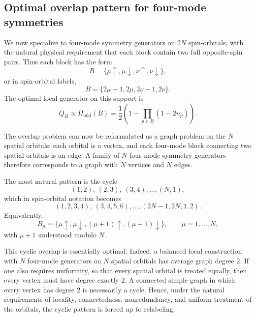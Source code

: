 \documentclass[11pt]{article}
\newcommand{\odd}{\mathrm{odd}}
\theoremstyle{definition}
\theoremstyle{remark}
\begin{document}
\subsection{Optimal overlap pattern for four-mode symmetries}
We now specialize to four-mode symmetry generators on $2N$ spin-orbitals, with the natural physical requirement that each block contain two full opposite-spin pairs. Thus each block has the form
\begin{equation}
  B=\{\mu\uparrow,\mu\downarrow,\nu\uparrow,\nu\downarrow\},
\end{equation}
or in spin-orbital labels,
\begin{equation}
  B=\{2\mu-1,2\mu,2\nu-1,2\nu\}.
\end{equation}
The optimal local generator on this support is
\begin{equation}
  Q_B \propto \Pi_{\odd}(B)=\frac12\left(1-\prod_{p\in B}(1-2n_p)\right).
\end{equation}

The overlap problem can now be reformulated as a graph problem on the $N$ spatial orbitals: each orbital is a vertex, and each four-mode block connecting two spatial orbitals is an edge. A family of $N$ four-mode symmetry generators therefore corresponds to a graph with $N$ vertices and $N$ edges.

The most natural pattern is the cycle
\begin{equation}
  (1,2),\ (2,3),\ (3,4),\dots,(N,1),
\end{equation}
which in spin-orbital notation becomes
\begin{equation}
  (1,2,3,4),\ (3,4,5,6),\dots,(2N-1,2N,1,2).
\end{equation}
Equivalently,
\begin{equation}
  B_\mu=
  \{\mu\uparrow,\mu\downarrow,(\mu+1)\uparrow,(\mu+1)\downarrow\},
  \qquad \mu=1,\dots,N,
\end{equation}
with $\mu+1$ understood modulo $N$.

This cyclic overlap is essentially optimal. Indeed, a balanced local construction with $N$ four-mode generators on $N$ spatial orbitals has average graph degree $2$. If one also requires uniformity, so that every spatial orbital is treated equally, then every vertex must have degree exactly $2$. A connected simple graph in which every vertex has degree $2$ is necessarily a cycle. Hence, under the natural requirements of locality, connectedness, nonredundancy, and uniform treatment of the orbitals, the cyclic pattern is forced up to relabeling.
\end{document}
